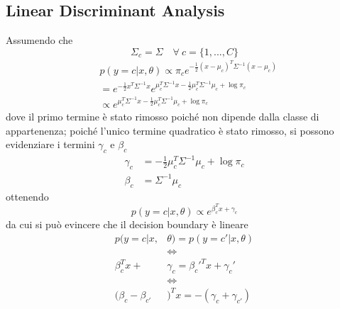 \documentclass[a4paper,8pt]{article}
\newenvironment{Figure}
  {\par\medskip\noindent\minipage{\linewidth}}
  {\endminipage\par\medskip}
\begin{document}
\begin{multicols}{2}
\subsection{Linear Discriminant Analysis}
Assumendo che 
\begin{equation}
\Sigma_c = \Sigma \quad \forall \ c = \{1, ..., C\}
\end{equation}
\begin{equation}
\begin{split}
&p(y=c|{x}, \theta) \propto  \pi_c e^{-\frac{1}{2}({x} - \mu_{c})^{T}\Sigma^{-1}({x} - \mu_{c})}\\
&= e^{-\frac{1}{2}x^T\Sigma^{-1}x} e^{\mu_c^T\Sigma^{-1}x-\frac{1}{2}\mu_c^T\Sigma^{-1}\mu_c + \log\pi_c}\\
&\propto e^{\mu_c^T\Sigma^{-1}x-\frac{1}{2}\mu_c^T\Sigma^{-1}\mu_c + \log\pi_c}
\end{split}
\end{equation}
dove il primo termine è stato rimosso poiché non dipende dalla classe di appartenenza; poiché l'unico termine quadratico è stato rimosso, si possono evidenziare i termini $\gamma_c$ e $\beta_c$
\begin{equation}
\begin{split}
\gamma_c &= -\frac{1}{2}\mu_c^T\Sigma^{-1}\mu_c + \log\pi_c\\
\beta_c &= \Sigma^{-1}\mu_c
\end{split}
\end{equation}
ottenendo
\begin{equation}
p(y=c|{x}, \theta) \propto e^{\beta_c^Tx+\gamma_c}
\end{equation}
da cui si può evincere che il decision boundary è lineare
\begin{equation}
\begin{split}
p(y=c|{x}, &\theta) = p(y=c'|{x}, \theta) \\
&\iff \\
\beta_c^Tx+&\gamma_c = \beta_c'^Tx+\gamma_c'\\
& \iff\\
(\beta_c - \beta_{c'}&)^Tx = -(\gamma_c + \gamma_{c'})
\end{split}
\end{equation}
\begin{Figure}
 \centering

\end{Figure}
\end{multicols}
\end{document}
